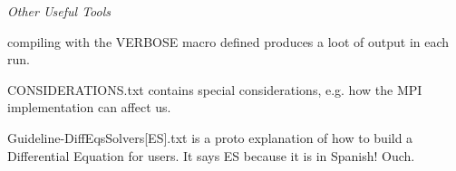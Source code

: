 \begin{center}{\itshape Other Useful Tools}\end{center} 


\begin{DoxyItemize}
\item compiling with the {\ttfamily V\+E\+R\+B\+O\+SE} macro defined produces a loot of output in each run.
\item {\ttfamily C\+O\+N\+S\+I\+D\+E\+R\+A\+T\+I\+O\+N\+S.\+txt} contains special considerations, e.\+g. how the M\+PI implementation can affect us.
\item {\ttfamily Guideline-\/\+Diff\+Eqs\+Solvers\mbox{[}ES\mbox{]}.txt} is a proto explanation of how to build a Differential Equation for users. It says \textquotesingle{}ES\textquotesingle{} because it is in Spanish! Ouch. 
\end{DoxyItemize}